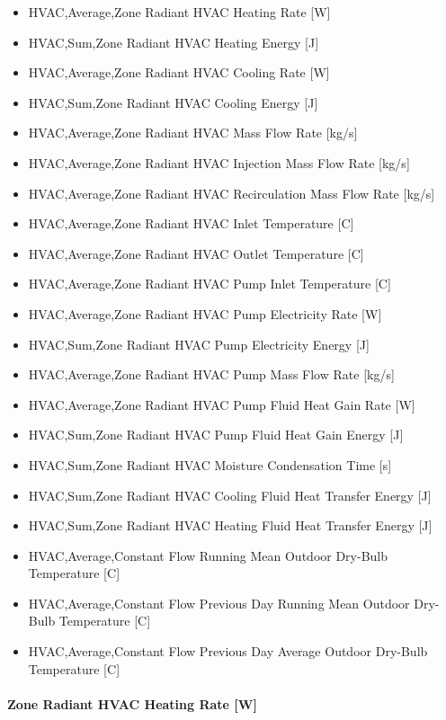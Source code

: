 \begin{itemize}
\item
  HVAC,Average,Zone Radiant HVAC Heating Rate {[}W{]}
\item
  HVAC,Sum,Zone Radiant HVAC Heating Energy {[}J{]}
\item
  HVAC,Average,Zone Radiant HVAC Cooling Rate {[}W{]}
\item
  HVAC,Sum,Zone Radiant HVAC Cooling Energy {[}J{]}
\item
  HVAC,Average,Zone Radiant HVAC Mass Flow Rate {[}kg/s{]}
\item
  HVAC,Average,Zone Radiant HVAC Injection Mass Flow Rate {[}kg/s{]}
\item
  HVAC,Average,Zone Radiant HVAC Recirculation Mass Flow Rate {[}kg/s{]}
\item
  HVAC,Average,Zone Radiant HVAC Inlet Temperature {[}C{]}
\item
  HVAC,Average,Zone Radiant HVAC Outlet Temperature {[}C{]}
\item
  HVAC,Average,Zone Radiant HVAC Pump Inlet Temperature {[}C{]}
\item
  HVAC,Average,Zone Radiant HVAC Pump Electricity Rate {[}W{]}
\item
  HVAC,Sum,Zone Radiant HVAC Pump Electricity Energy {[}J{]}
\item
  HVAC,Average,Zone Radiant HVAC Pump Mass Flow Rate {[}kg/s{]}
\item
  HVAC,Average,Zone Radiant HVAC Pump Fluid Heat Gain Rate {[}W{]}
\item
  HVAC,Sum,Zone Radiant HVAC Pump Fluid Heat Gain Energy {[}J{]}
\item
  HVAC,Sum,Zone Radiant HVAC Moisture Condensation Time {[}s{]}
\item
  HVAC,Sum,Zone Radiant HVAC Cooling Fluid Heat Transfer Energy {[}J{]}
\item
  HVAC,Sum,Zone Radiant HVAC Heating Fluid Heat Transfer Energy {[}J{]}
\item
  HVAC,Average,Constant Flow Running Mean Outdoor Dry-Bulb Temperature {[}C{]}
\item
  HVAC,Average,Constant Flow Previous Day Running Mean Outdoor Dry-Bulb Temperature {[}C{]}
\item
  HVAC,Average,Constant Flow Previous Day Average Outdoor Dry-Bulb Temperature {[}C{]}
\end{itemize}

\paragraph{Zone Radiant HVAC Heating Rate {[}W{]}}\label{zone-radiant-hvac-heating-rate-w-1}

